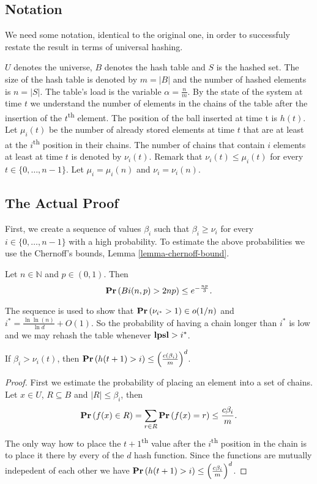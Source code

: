 \subsection{Notation}
We need some notation, identical to the original one, in order to successfuly restate the result in terms of universal hashing.

$U$ denotes the universe, $B$ denotes the hash table and $S$ is the hashed set. The size of the hash table is denoted by $m = |B|$ and the number of hashed elements is $n = |S|$. The table's load is the variable $\alpha = \frac{n}{m}$. By the state of the system at time $t$ we understand the number of elements in the chains of the table after the insertion of the $t$\textsuperscript{th} element.
The position of the ball inserted at time t is $h(t)$. Let $\mu_i(t)$ be the number of already stored elements at time $t$ that are at least at the $i$\textsuperscript{th} position in their chains. The number of chains that contain $i$ elements at least at time $t$ is denoted by $\nu_i(t)$. Remark that $\nu_i(t) \leq \mu_i(t)$ for every $t \in \{0, \dots, n - 1 \}$. Let $\mu_i = \mu_i(n)$ and $\nu_i = \nu_i(n)$.

\subsection{The Actual Proof}
First, we create a sequence of values $\beta_i$ such that $\beta_i \geq \nu_i$ for every $i \in \{0, \dots, n - 1\}$ with a high probability. To estimate the above probabilities we use the Chernoff's bounds, Lemma \ref{lemma-chernoff-bound}.

\begin{lemma}
\label{lemma-chernoff-bound}
Let $n \in \mathbb{N}$ and $p \in (0, 1)$. Then $$\mathbf{Pr}\left(Bi(n, p) > 2np\right) \leq e ^ {- \frac{np}{3}} \textit{.}$$
\end{lemma}

The sequence is used to show that $\mathbf{Pr}\left(\nu_{i^{*}} > 1\right) \in o(1/n)$ and $i^* = \frac{\ln \ln (n)}{\ln d} + O(1)$. So the probability of having a chain longer than $i^*$ is low and we may rehash the table whenever $\mathbf{lpsl} > i^*$.

\begin{lemma}
\label{lemma-height-of-inserted-ball}
If $\beta_i > \nu_i(t)$, then $\mathbf{Pr}\left(h(t + 1) > i\right) \leq \left(\frac{c(\beta_i)}{m}\right) ^ d$.
\end{lemma}
\begin{proof}
First we estimate the probability of placing an element into a set of chains. Let $x \in U$, $R \subseteq B$ and $|R| \leq \beta_i$, then $$\mathbf{Pr}\left(f(x) \in R\right) = \displaystyle\sum_{r \in R} \mathbf{Pr}\left(f(x) = r\right) \leq \frac{c\beta_i}{m} \textit{.}$$
The only way how to place the $t + 1$\textsuperscript{th} value after the $i$\textsuperscript{th} position in the chain is to place it there by every of the $d$ hash function. Since the functions are mutually indepedent of each other we have $\mathbf{Pr}\left(h(t + 1) > i\right) \leq \left(\frac{c \beta_i}{m}\right) ^ d$.
\end{proof}

